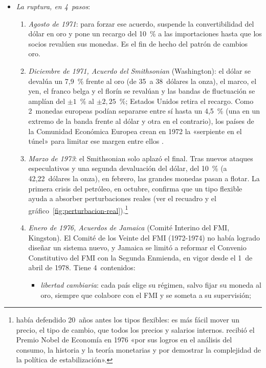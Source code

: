\documentclass[11pt]{article}
\begin{document}
\begin{itemize}
\item \emph{La ruptura, en 4~pasos}\nocite{Eichengreen2019Globalizing,FMI1976Jamaica,CEA1972ERP}:
  \begin{enumerate}
  \item \emph{Agosto de 1971}: para forzar ese acuerdo,  suspende la convertibilidad del dólar en oro y pone un recargo del 10~\% a las importaciones hasta que los socios revalúen sus monedas\nocite{Nixon1971Discurso}. Es el fin de hecho del patrón de cambios oro.
  \item \emph{Diciembre de 1971, Acuerdo del Smithsonian} (Washington): el dólar se devalúa un 7,9~\% frente al oro (de 35~a 38~dólares la onza), el marco, el yen, el franco belga y el florín se revalúan y las bandas de fluctuación se amplían del $\pm1$~\% al $\pm2,25$~\%; Estados Unidos retira el recargo. Como 2~monedas europeas podían separarse entre sí hasta un 4,5~\% (una en un extremo de la banda frente al dólar y otra en el contrario), los países de la Comunidad Económica Europea crean en 1972 la «serpiente en el túnel» para limitar ese margen entre ellos .
  \item \emph{Marzo de 1973}: el Smithsonian solo aplazó el final. Tras nuevos ataques especulativos y una segunda devaluación del dólar, del 10~\% (a 42,22~dólares la onza), en febrero, las grandes monedas pasan a flotar. La primera crisis del petróleo, en octubre, confirma que un tipo flexible ayuda a absorber perturbaciones reales (ver el recuadro y el gráfico~\ref{fig:perturbacion-real}).\footnote{\textcite{Friedman1953Case} había defendido 20~años antes los tipos flexibles: es más fácil mover un precio, el tipo de cambio, que todos los precios y salarios internos.  recibió el Premio Nobel de Economía en 1976 «por sus logros en el análisis del consumo, la historia y la teoría monetarias y por demostrar la complejidad de la política de estabilización»\nocite{Nobel1976Friedman}.}
  \item \emph{Enero de 1976, Acuerdos de Jamaica} (Comité Interino del FMI, Kingston). El Comité de los Veinte del FMI (1972-1974) no había logrado diseñar un sistema nuevo, y Jamaica se limitó a reformar el Convenio Constitutivo del FMI con la Segunda Enmienda, en vigor desde el 1~de abril de 1978\nocite{FMI1976Jamaica}. Tiene 4~contenidos:
    \begin{itemize}
    \item \emph{libertad cambiaria}: cada país elige su régimen, salvo fijar su moneda al oro, siempre que colabore con el FMI y se someta a su supervisión;

\end{itemize}
\end{enumerate}
\end{itemize}
\end{document}
